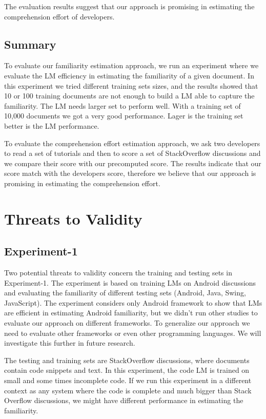 \documentclass[12pt,mscthesis]{usiinfthesis}
\begin{document}
{The evaluation results suggest that our approach is promising in estimating the comprehension effort of developers. 


\section{Summary}
To evaluate our familiarity estimation approach, we run an experiment where we evaluate the LM efficiency in estimating the familiarity of a given document. In this experiment we tried different training sets sizes, and the results showed that 10 or 100 training documents are not enough to build a LM able to capture the familiarity. The LM needs larger set to perform well. With a training set of 10,000 documents we got a very good performance. Lager is the training set better is the LM performance.

To evaluate the comprehension effort estimation approach, we ask two developers to read a set of tutorials and then to score a set of StackOverflow discussions and we compare their score with our precomputed score. The results indicate that our score match with the developers score, therefore we believe that our approach is promising in estimating the comprehension effort.


\chapter{Threats to Validity}
\section{Experiment-1}

Two potential threats to validity concern the training and testing sets in Experiment-1.
The experiment is based on training LMs on Android discussions and evaluating the familiarity of different testing sets (Android, Java, Swing, JavaScript). The experiment considers only Android framework to show that LMs are efficient in estimating Android familiarity, but we didn't run other studies to evaluate our approach on different frameworks. To generalize our approach we need to evaluate other frameworks or even other programming languages. We will investigate this further in future research.

The testing and training sets are StackOverflow discussions, where documents contain code snippets and text. In this experiment, the code LM is trained on small and some times incomplete code. If we run this experiment in a different context as any system where the code is complete and much bigger than Stack Overflow discussions, we might have different performance in estimating the familiarity.

}
\end{document}

